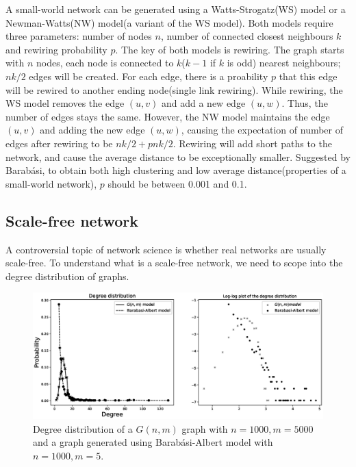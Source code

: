 \documentclass[12pt]{article}
\begin{document}
A small-world network can be generated using a Watts-Strogatz(WS) model\cite{wsmodel} or a Newman-Watts(NW) model(a variant of the WS model)\cite{nwmodel}. Both models require three parameters: number of nodes $n$, number of connected closest neighbours $k$ and rewiring probability $p$. The key of both models is rewiring. The graph starts with $n$ nodes, each node is connected to $k$($k-1$ if $k$ is odd) nearest neighbours; $nk/2$ edges will be created. For each edge, there is a proability $p$ that this edge will be rewired to another ending node(single link rewiring). While rewiring, the WS model removes the edge $(u,v)$ and add a new edge $(u,w)$. Thus, the number of edges stays the same. However, the NW model maintains the edge $(u,v)$ and adding the new edge $(u,w)$, causing the expectation of number of edges after rewiring to be $nk/2+pnk/2$. Rewiring will add short paths to the network, and cause the average distance to be exceptionally smaller. Suggested by Barabási\cite{barabási2016network}, to obtain both high clustering and low average distance(properties of a small-world network), $p$ should be between 0.001 and 0.1.\\


\subsection{Scale-free network}
A controversial topic of network science is whether
real networks are usually scale-free\cite{holme2019rare}. To understand what is a scale-free network, we need to scope into the degree distribution of graphs.\\

\begin{figure}[ht]
    \centering
    \includegraphics[width=\textwidth]{degree_distribution.eps}
    \centering
    \caption{Degree distribution of a $G(n,m)$ graph with $n=1000,m=5000$ and a graph generated using Barabási-Albert model with $n=1000,m=5$.}
    \label{fig:degree_dist}
\end{figure}
\end{document}
